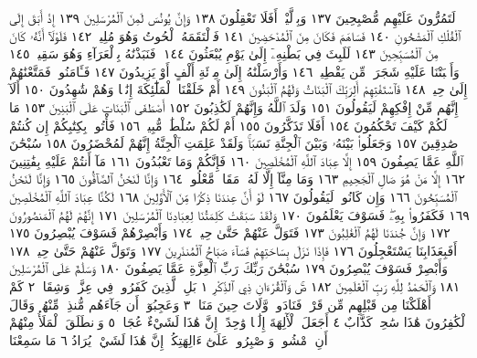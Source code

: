 لَتَمُرُّونَ عَلَيْهِم مُّصْبِحِينَ ١٣٧ وَبِٱلَّيْلِۚ أَفَلَا تَعْقِلُونَ ١٣٨ وَإِنَّ
يُونُسَ لَمِنَ ٱلْمُرْسَلِينَ ١٣٩ إِذْ أَبَقَ إِلَى ٱلْفُلْكِ ٱلْمَشْحُونِ ١٤٠
فَسَاهَمَ فَكَانَ مِنَ ٱلْمُدْحَضِينَ ١٤١ فَٱلْتَقَمَهُ ٱلْحُوتُ وَهُوَ مُلِيمࣱ ١٤٢
فَلَوْلَآ أَنَّهُۥ كَانَ مِنَ ٱلْمُسَبِّحِينَ ١٤٣ لَلَبِثَ فِي بَطْنِهِۦٓ إِلَىٰ يَوْمِ
يُبْعَثُونَ ١٤٤۞ فَنَبَذْنَٰهُ بِٱلْعَرَآءِ وَهُوَ سَقِيمࣱ ١٤٥ وَأَنۢبَتْنَا
عَلَيْهِ شَجَرَةࣰ مِّن يَقْطِينࣲ ١٤٦ وَأَرْسَلْنَٰهُ إِلَىٰ مِا۟ئَةِ أَلْفٍ أَوْ
يَزِيدُونَ ١٤٧ فَـَٔامَنُوا۟ فَمَتَّعْنَٰهُمْ إِلَىٰ حِينࣲ ١٤٨ فَٱسْتَفْتِهِمْ
أَلِرَبِّكَ ٱلْبَنَاتُ وَلَهُمُ ٱلْبَنُونَ ١٤٩ أَمْ خَلَقْنَا ٱلْمَلَٰٓئِكَةَ إِنَٰثࣰا
وَهُمْ شَٰهِدُونَ ١٥٠ أَلَآ إِنَّهُم مِّنْ إِفْكِهِمْ لَيَقُولُونَ ١٥١ وَلَدَ
ٱللَّهُ وَإِنَّهُمْ لَكَٰذِبُونَ ١٥٢ أَصْطَفَى ٱلْبَنَاتِ عَلَى ٱلْبَنِينَ ١٥٣
مَا لَكُمْ كَيْفَ تَحْكُمُونَ ١٥٤ أَفَلَا تَذَكَّرُونَ ١٥٥ أَمْ لَكُمْ سُلْطَٰنࣱ
مُّبِينࣱ ١٥٦ فَأْتُوا۟ بِكِتَٰبِكُمْ إِن كُنتُمْ صَٰدِقِينَ ١٥٧ وَجَعَلُوا۟ بَيْنَهُۥ
وَبَيْنَ ٱلْجِنَّةِ نَسَبࣰاۚ وَلَقَدْ عَلِمَتِ ٱلْجِنَّةُ إِنَّهُمْ لَمُحْضَرُونَ ١٥٨
سُبْحَٰنَ ٱللَّهِ عَمَّا يَصِفُونَ ١٥٩ إِلَّا عِبَادَ ٱللَّهِ ٱلْمُخْلَصِينَ ١٦٠
فَإِنَّكُمْ وَمَا تَعْبُدُونَ ١٦١ مَآ أَنتُمْ عَلَيْهِ بِفَٰتِنِينَ ١٦٢
إِلَّا مَنْ هُوَ صَالِ ٱلْجَحِيمِ ١٦٣ وَمَا مِنَّآ إِلَّا لَهُۥ مَقَامࣱ مَّعْلُومࣱ ١٦٤
وَإِنَّا لَنَحْنُ ٱلصَّآفُّونَ ١٦٥ وَإِنَّا لَنَحْنُ ٱلْمُسَبِّحُونَ ١٦٦
وَإِن كَانُوا۟ لَيَقُولُونَ ١٦٧ لَوْ أَنَّ عِندَنَا ذِكْرࣰا مِّنَ ٱلْأَوَّلِينَ ١٦٨
لَكُنَّا عِبَادَ ٱللَّهِ ٱلْمُخْلَصِينَ ١٦٩ فَكَفَرُوا۟ بِهِۦۖ فَسَوْفَ يَعْلَمُونَ ١٧٠ وَلَقَدْ
سَبَقَتْ كَلِمَتُنَا لِعِبَادِنَا ٱلْمُرْسَلِينَ ١٧١ إِنَّهُمْ لَهُمُ ٱلْمَنصُورُونَ ١٧٢
وَإِنَّ جُندَنَا لَهُمُ ٱلْغَٰلِبُونَ ١٧٣ فَتَوَلَّ عَنْهُمْ حَتَّىٰ حِينࣲ ١٧٤ وَأَبْصِرْهُمْ
فَسَوْفَ يُبْصِرُونَ ١٧٥ أَفَبِعَذَابِنَا يَسْتَعْجِلُونَ ١٧٦ فَإِذَا نَزَلَ بِسَاحَتِهِمْ
فَسَآءَ صَبَاحُ ٱلْمُنذَرِينَ ١٧٧ وَتَوَلَّ عَنْهُمْ حَتَّىٰ حِينࣲ ١٧٨ وَأَبْصِرْ
فَسَوْفَ يُبْصِرُونَ ١٧٩ سُبْحَٰنَ رَبِّكَ رَبِّ ٱلْعِزَّةِ عَمَّا يَصِفُونَ ١٨٠
وَسَلَٰمٌ عَلَى ٱلْمُرْسَلِينَ ١٨١ وَٱلْحَمْدُ لِلَّهِ رَبِّ ٱلْعَٰلَمِينَ ١٨٢
صٓۚ وَٱلْقُرْءَانِ ذِي ٱلذِّكْرِ ١ بَلِ ٱلَّذِينَ كَفَرُوا۟ فِي عِزَّةࣲ وَشِقَاقࣲ ٢
كَمْ أَهْلَكْنَا مِن قَبْلِهِم مِّن قَرْنࣲ فَنَادَوا۟ وَّلَاتَ حِينَ مَنَاصࣲ ٣ وَعَجِبُوٓا۟
أَن جَآءَهُم مُّنذِرࣱ مِّنْهُمْۖ وَقَالَ ٱلْكَٰفِرُونَ هَٰذَا سَٰحِرࣱ كَذَّابٌ ٤ أَجَعَلَ
ٱلْأٓلِهَةَ إِلَٰهࣰا وَٰحِدًاۖ إِنَّ هَٰذَا لَشَيْءٌ عُجَابࣱ ٥ وَٱنطَلَقَ ٱلْمَلَأُ مِنْهُمْ أَنِ
ٱمْشُوا۟ وَٱصْبِرُوا۟ عَلَىٰٓ ءَالِهَتِكُمْۖ إِنَّ هَٰذَا لَشَيْءࣱ يُرَادُ ٦ مَا سَمِعْنَا
